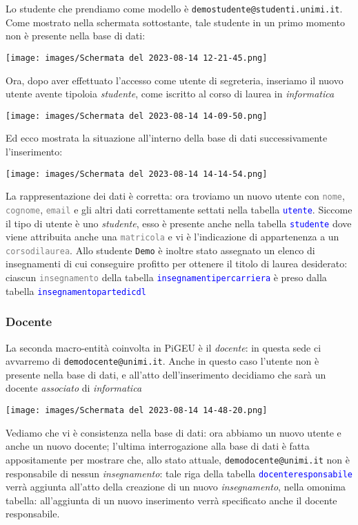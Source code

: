 \documentclass{article}
\newcommand{\tabb}[1]{\texttt{\textcolor{blue}{#1}}}
\newcommand{\attr}[1]{\texttt{\textcolor{gray}{#1}}}
\newcommand{\und}[0]{\textunderscore}
\begin{document}
Lo studente che prendiamo come modello è \texttt{demo\und studente@studenti.unimi.it}. Come mostrato nella schermata sottostante, tale studente in un primo momento non è presente nella base di dati:

\texttt{[image: images/Schermata del 2023-08-14 12-21-45.png]}

Ora, dopo aver effettuato l'accesso come utente di segreteria, inseriamo il nuovo utente avente tipoloia \textit{studente}, come iscritto al corso di laurea in \textit{informatica}

\texttt{[image: images/Schermata del 2023-08-14 14-09-50.png]}

\pagebreak

Ed ecco mostrata la situazione all'interno della base di dati successivamente l'inserimento:

\texttt{[image: images/Schermata del 2023-08-14 14-14-54.png]}

La rappresentazione dei dati è corretta: ora troviamo un nuovo utente con \attr{nome}, \attr{cognome}, \attr{email} e gli altri dati correttamente settati nella tabella \tabb{utente}. Siccome il tipo di utente è uno \textit{studente}, esso è presente anche nella tabella \tabb{studente} dove viene attribuita anche una \attr{matricola} e vi è l'indicazione di appartenenza a un \attr{corso\und di\und laurea}. Allo studente \texttt{Demo} è inoltre stato assegnato un elenco di insegnamenti di cui conseguire profitto per ottenere il titolo di laurea desiderato: ciascun \attr{insegnamento} della tabella \tabb{insegnamenti\und per\und carriera} è preso dalla tabella \tabb{insegnamento\und parte\und di\und cdl}

\subsubsection{Docente}
La seconda macro-entità coinvolta in PiGEU è il \textit{docente}: in questa sede ci avvarremo di \texttt{demo\und docente@unimi.it}. Anche in questo caso l'utente non è presente nella base di dati, e all'atto dell'inserimento decidiamo che sarà un docente \textit{associato} di \textit{informatica}

\texttt{[image: images/Schermata del 2023-08-14 14-48-20.png]}

Vediamo che vi è consistenza nella base di dati: ora abbiamo un nuovo utente e anche un nuovo docente; l'ultima interrogazione alla base di dati è fatta appositamente per mostrare che, allo stato attuale, \texttt{demo\und docente@unimi.it} non è responsabile di nessun \textit{insegnamento}: tale riga della tabella \tabb{docente\und responsabile} verrà aggiunta all'atto della creazione di un nuovo \textit{insegnamento}, nella omonima tabella: all'aggiunta di un nuovo inserimento verrà specificato anche il docente responsabile.
\end{document}
